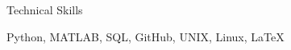 \documentclass{resume}
\begin{document}
\begin{rSection}{Technical Skills}

{\normalfont Python, MATLAB, SQL, GitHub, UNIX, Linux, LaTeX}

\end{rSection}


\end{document}

